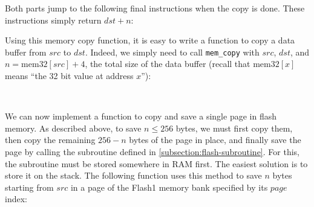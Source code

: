 \begin{TwoColumns}
\end{TwoColumns}

Both parts jump to the following final instructions when the copy is done.
These instructions simply return $dst+n$:

\begin{TwoColumns}
\end{TwoColumns}

Using this memory copy function, it is easy to write a function to copy a data
buffer from $src$ to $dst$. Indeed, we simply need to call \verb!mem_copy! with
$src$, $dst$, and $n=\mathrm{mem32}[src]+4$, the total size of the data buffer
(recall that $\mathrm{mem32}[x]$ means ``the 32 bit value at address $x$''):

\begin{TwoColumns}
\\
\end{TwoColumns}

We can now implement a function to copy and save a single page in flash memory.
As described above, to save $n \le 256$ bytes, we must first copy them, then
copy the remaining $256-n$ bytes of the page in place, and finally save the
page by calling the subroutine defined in \cref{subsection:flash-subroutine}.
For this, the subroutine must be stored somewhere in RAM first. The easiest
solution is to store it on the stack. The following function uses this method
to save $n$ bytes starting from $src$ in a page of the Flash1 memory bank
specified by its $page$ index:

